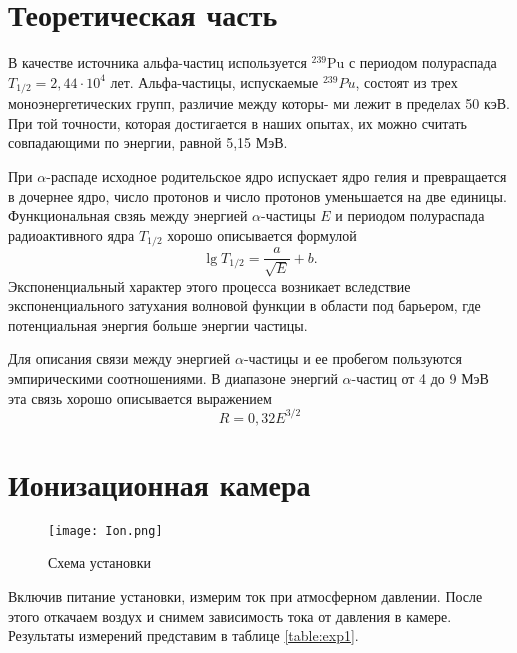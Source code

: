 


    

    \section*{Теоретическая часть}

    В качестве источника альфа-частиц используется $ ^{239}  $Pu  с периодом полураспада $ T_{1/2} = 2,44 \cdot 10^4 $ лет. Альфа-частицы, испускаемые $ ^{239} Pu $, состоят из трех моноэнергетических групп, различие между которы-
	ми лежит в пределах 50 кэВ. При той точности, которая достигается
	в наших опытах, их можно считать совпадающими по энергии, равной
	5,15 МэВ.

    При $\alpha$-распаде исходное родительское ядро испускает ядро гелия и превращается в дочернее ядро, число протонов и число протонов уменьшается на две единицы. Функциональная свзяь между энергией $\alpha$-частицы $E$ и периодом полураспада радиоактивного ядра $T_{1/2}$ хорошо описывается формулой
	\begin{equation*}
		 \lg T_{1/2} = \frac{a}{\sqrt{E}} + b.
	\end{equation*}
	Экспоненциальный характер этого процесса возникает вследствие экспоненциального затухания волновой функции в области под барьером, где потенциальная энергия больше энергии частицы.
	
	Для описания связи между энергией $\alpha$-частицы и ее пробегом пользуются эмпирическими соотношениями. В диапазоне энергий $\alpha$-частиц от 4 до 9 МэВ эта связь хорошо описывается выражением
	\begin{equation*}
		\label{eq:R(E)}
		\tag{$\star$}
		R = 0,32E^{3/2}
	\end{equation*}

    \section*{Ионизационная камера}

    \begin{figure}[h!]
        \centering
        \texttt{[image: Ion.png]}
        \caption{Схема установки}
        \label{fig:Ion}
    \end{figure}
    
    Включив питание установки, измерим ток при атмосферном давлении. После этого откачаем воздух
    и снимем зависимость тока от давления в камере. Результаты измерений представим в таблице \ref{table:exp1}.

